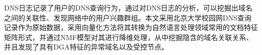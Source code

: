 DNS日志记录了用户的DNS查询行为，通过对DNS日志的分析，可以挖掘出域名之间的关联性、发现网络中的用户兴趣群组。本文采用北京大学校园网DNS查询记录作为原始数据，采用向量化方法将其转换为自然语言处理领域常用的文档特征矩阵形式，并通过NMF模型对其进行降维处理，从中挖掘隐含的域名关联关系、并且发现了具有DGA特征的异常域名以及受控节点。